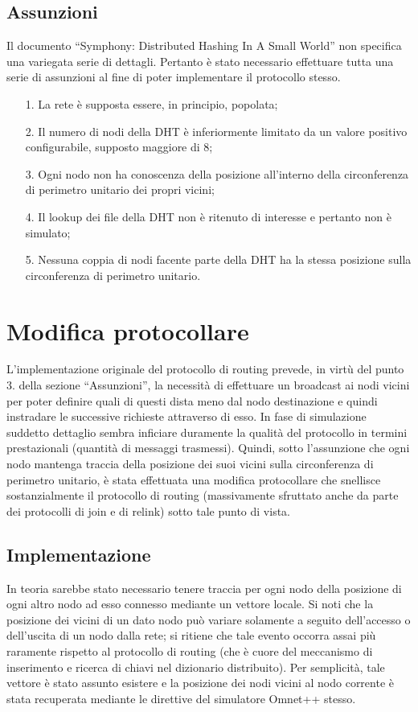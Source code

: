 \documentclass[	
	DIV=calc,
	paper=a4,
	fontsize=11pt,
	onecolumn
]{scrartcl} %
\begin{document}
	\subsection{Assunzioni}
	Il documento ``Symphony: Distributed Hashing In A Small World'' non specifica una variegata serie di dettagli. Pertanto è stato necessario effettuare tutta una serie di assunzioni al fine di poter implementare il protocollo stesso.
	\begin{itemize}
	\item[1.] La rete è supposta essere, in principio, popolata;
	\item[2.] Il numero di nodi della DHT è inferiormente limitato da un valore positivo configurabile, supposto maggiore di 8;
	\item[3.] Ogni nodo non ha conoscenza della posizione all'interno della circonferenza di perimetro unitario dei propri vicini;
	\item[4.] Il lookup dei file della DHT non è ritenuto di interesse e pertanto non è simulato;
	\item[5.] Nessuna coppia di nodi facente parte della DHT ha la stessa posizione sulla circonferenza di perimetro unitario.
	\end{itemize}
	
\section{Modifica protocollare}
	L'implementazione originale del protocollo di routing prevede, in virtù del punto 3. della sezione ``Assunzioni'', la necessità di effettuare un broadcast ai nodi vicini per poter definire quali di questi dista meno dal nodo destinazione e quindi instradare le successive richieste attraverso di esso. In fase di simulazione suddetto dettaglio sembra inficiare duramente la qualità del protocollo in termini prestazionali (quantità di messaggi trasmessi). Quindi, sotto l'assunzione che ogni nodo mantenga traccia della posizione dei suoi vicini sulla circonferenza di perimetro unitario, è stata effettuata una modifica protocollare che snellisce sostanzialmente il protocollo di routing (massivamente sfruttato anche da parte dei protocolli di join e di relink) sotto tale punto di vista. 	
	\subsection{Implementazione}	
	In teoria sarebbe stato necessario tenere traccia per ogni nodo della posizione di ogni altro nodo ad esso connesso mediante un vettore locale. Si noti che la posizione dei vicini di un dato nodo può variare solamente a seguito dell'accesso o dell'uscita di un nodo dalla rete; si ritiene che tale evento occorra assai più raramente rispetto al protocollo di routing (che è cuore del meccanismo di inserimento e ricerca di chiavi nel dizionario distribuito). Per semplicità, tale vettore è stato assunto esistere e la posizione dei nodi vicini al nodo corrente è stata recuperata mediante le direttive del simulatore Omnet++ stesso. 
\end{document}
